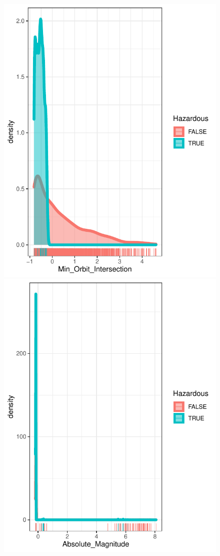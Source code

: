 \documentclass[12pt,%
               a4paper,%
               oneside,openany,%
               titlepage,%
               headinclude,footinclude,%
               BCOR5mm,%
               cleardoublepage=empty,%
               tablecaptionabove,%
               floatperchapter,
               ]{scrreprt}                 %
\begin{document}
\begin{figure}[ht]
\begin{minipage}[b]{0.5\linewidth}
    \includegraphics[width=.9\linewidth]{Figures/DENSITY_Min_orbit_intersection.pdf}
    \vspace{4ex}
  \end{minipage}
  \begin{minipage}[b]{0.5\linewidth}
    \centering
    \includegraphics[width=.9\linewidth]{Figures/DENSITY_Absolute_magnitude.pdf}

\end{minipage}
\end{figure}
\end{document}
